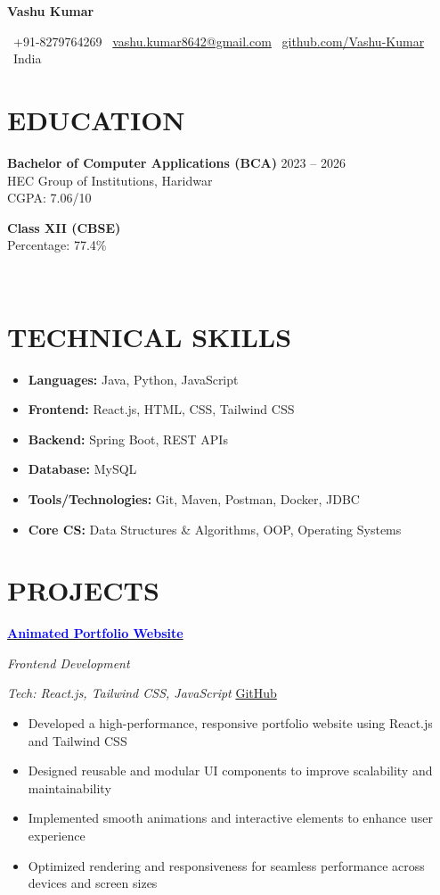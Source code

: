 \documentclass[11pt,a4paper]{article}
\newcommand{\contact}[4]{
    \noindent
    \faPhone\ #1 \hfill
    \faEnvelope\ #2 \hfill
    \faGithub\ #3 \hfill
    \faMapMarker\ #4
}
\newcommand{\datedentry}[4]{
    \noindent
    \begin{minipage}[t]{0.7\textwidth}
        \textbf{#1}\\
        #2
    \end{minipage}%
    \hfill%
    \begin{minipage}[t]{0.25\textwidth}
        \raggedleft
        #3\\
        #4
    \end{minipage}
}
\newcommand{\projectentry}[2]{
    \vspace{8pt}
    \noindent
    \begin{minipage}[t]{0.7\textwidth}
        \textbf{#1}
    \end{minipage}%
    \hfill%
    \begin{minipage}[t]{0.25\textwidth}
        \raggedleft
        \textit{#2}
    \end{minipage}
}
\begin{document}
\begin{center}
    {\Huge\bfseries Vashu Kumar}\\[4pt]
\end{center}

\contact{+91-8279764269}
{\href{mailto:vashu.kumar8642@gmail.com}{vashu.kumar8642@gmail.com}}
{\href{https://github.com/Vashu-Kumar}{github.com/Vashu-Kumar}}
{India}

\section{EDUCATION}
\textbf{Bachelor of Computer Applications (BCA)} \hfill 2023 -- 2026\\
HEC Group of Institutions, Haridwar\\
CGPA: 7.06/10

\datedentry{Class XII (CBSE)}{Percentage: 77.4\%}{2023}{}


\section{TECHNICAL SKILLS}

\begin{itemize}
    \item \textbf{Languages:} Java, Python, JavaScript
    \item \textbf{Frontend:} React.js, HTML, CSS, Tailwind CSS
    \item \textbf{Backend:} Spring Boot, REST APIs
    \item \textbf{Database:} MySQL
    \item \textbf{Tools/Technologies:} Git, Maven, Postman, Docker, JDBC
    \item \textbf{Core CS:} Data Structures \& Algorithms, OOP, Operating Systems
\end{itemize}

\section{PROJECTS}
\projectentry{\href{https://portfolio-mauve-ten-g85z459epl.vercel.app/}
{\textcolor{blue}{Animated Portfolio Website}}}{Frontend Development}
\textit{Tech: React.js, Tailwind CSS, JavaScript} \hfill
\href{https://github.com/Vashu-Kumar}{GitHub} 
\begin{itemize}
\item Developed a high-performance, responsive portfolio website using React.js and Tailwind CSS
\item Designed reusable and modular UI components to improve scalability and maintainability
\item Implemented smooth animations and interactive elements to enhance user experience
\item Optimized rendering and responsiveness for seamless performance across devices and screen sizes
\end{itemize}
\end{document}
